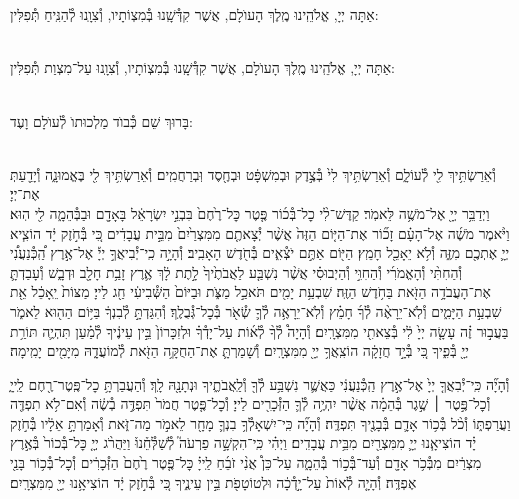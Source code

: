 \documentclass[twoside, openany, parskip=half, 11pt]{book}
\begin{document}
\\
\\
אַתָּה יְיָ, אֱלֹהֵֽינוּ מֶֽלֶךְ הָעוֺלָם, אֲשֶׁר קִדְּ֯שָֽׁנוּ בְּ֯מִצְוֹתָיו, וְ֯צִוָֽנוּ לְ֯הַנִּֽיחַ תְּ֯פִלִּין:

\\
אַתָּה יְיָ, אֱלֹהֵֽינוּ מֶֽלֶךְ הָעוֺלָם, אֲשֶׁר קִדְּ֯שָֽׁנוּ בְּ֯מִצְוֹתָיו, וְ֯צִוָֽנוּ עַל־מִצְוַת תְּ֯פִלִּין:

\\
בָּרוּךְ שֵׁם כְּ֯בוֺד מַלְכוּתוֺ לְ֯עוֺלָם וָעֶד:


\\
וְ֯אֵרַשְׂתִּ֥יךְ לִ֖י לְ֯עוֹלָ֑ם וְ֯אֵרַשְׂתִּ֥יךְ לִי֙ בְּ֯צֶ֣דֶק וּבְמִשְׁפָּ֔ט וּבְחֶ֖סֶד וּֽבְרַחֲמִֽים׃ וְ֯אֵרַשְׂתִּ֥יךְ לִ֖י בֶּאֱמוּנָ֑ה וְ֯יָדַ֖עַתְּ אֶת־יְיָ׃\\
וַיְדַבֵּ֥ר יְיָ֖ אֶל־מֹשֶׁ֥ה לֵּאמֹֽר׃ קַדֶּשׁ־לִ֨י כׇל־בְּ֯כ֜וֹר פֶּ֤טֶר כׇּל־רֶ֙חֶם֙ בִּבְנֵ֣י יִשְׂרָאֵ֔ל בָּאָדָ֖ם וּבַבְּ֯הֵמָ֑ה לִ֖י הֽוּא׃ וַיֹּ֨אמֶר מֹשֶׁ֜ה אֶל־הָעָ֗ם זָכ֞וֹר אֶת־הַיּ֤וֹם הַזֶּה֙ אֲשֶׁ֨ר יְ֯צָאתֶ֤ם מִמִּצְרַ֙יִם֙ מִבֵּ֣ית עֲבָדִ֔ים כִּ֚י בְּ֯חֹ֣זֶק יָ֔ד הוֹצִ֧יא יְיָ֛ אֶתְכֶ֖ם מִזֶּ֑ה וְ֯לֹ֥א יֵאָכֵ֖ל חָמֵֽץ׃ הַיּ֖וֹם אַתֶּ֣ם יֹצְ֯אִ֑ים בְּ֯חֹ֖דֶשׁ הָאָבִֽיב׃ וְ֯הָיָ֣ה כִֽי־יְ֯בִיאֲךָ֣ יְיָ֡ אֶל־אֶ֣רֶץ הַֽ֠כְּ֯נַעֲנִ֠י וְ֯הַחִתִּ֨י וְ֯הָאֱמֹרִ֜י וְ֯הַחִוִּ֣י וְ֯הַיְבוּסִ֗י אֲשֶׁ֨ר נִשְׁבַּ֤ע לַאֲבֹתֶ֙יךָ֙ לָ֣תֶת לָ֔ךְ אֶ֛רֶץ זָבַ֥ת חָלָ֖ב וּדְבָ֑שׁ וְ֯עָבַדְתָּ֛ אֶת־הָעֲבֹדָ֥ה הַזֹּ֖את בַּחֹ֥דֶשׁ הַזֶּֽה׃ שִׁבְעַ֥ת יָמִ֖ים תֹּאכַ֣ל מַצֹּ֑ת וּבַיּוֹם֙ הַשְּׁ֯בִיעִ֔י חַ֖ג לַייָ׃ מַצּוֹת֙ יֵֽאָכֵ֔ל אֵ֖ת שִׁבְעַ֣ת הַיָּמִ֑ים וְ֯לֹֽא־יֵרָאֶ֨ה לְ֯ךָ֜ חָמֵ֗ץ וְ֯לֹֽא־יֵרָאֶ֥ה לְ֯ךָ֛ שְׂ֯אֹ֖ר בְּ֯כׇל־גְּ֯בֻלֶֽךָ׃ וְ֯הִגַּדְתָּ֣ לְ֯בִנְךָ֔ בַּיּ֥וֹם הַה֖וּא לֵאמֹ֑ר בַּעֲב֣וּר זֶ֗ה עָשָׂ֤ה יְיָ֙ לִ֔י בְּ֯צֵאתִ֖י מִמִּצְרָֽיִם׃ וְ֯הָיָה֩ לְ֯ךָ֨ לְ֯א֜וֹת עַל־יָדְ֯ךָ֗ וּלְזִכָּרוֹן֙ בֵּ֣ין עֵינֶ֔יךָ לְ֯מַ֗עַן תִּהְיֶ֛ה תּוֹרַ֥ת יְיָ֖ בְּ֯פִ֑יךָ כִּ֚י בְּ֯יָ֣ד חֲזָקָ֔ה הוֹצִֽאֲךָ֥ יְיָ֖ מִמִּצְרָֽיִם׃ וְ֯שָׁמַרְתָּ֛ אֶת־הַחֻקָּ֥ה הַזֹּ֖את לְ֯מוֹעֲדָ֑הּ מִיָּמִ֖ים יָמִֽימָה׃

וְ֯הָיָ֞ה כִּֽי־יְ֯בִאֲךָ֤ יְיָ֙ אֶל־אֶ֣רֶץ הַֽכְּ֯נַעֲנִ֔י כַּאֲשֶׁ֛ר נִשְׁבַּ֥ע לְ֯ךָ֖ וְ֯לַֽאֲבֹתֶ֑יךָ וּנְתָנָ֖הּ לָֽךְ׃ וְ֯הַעֲבַרְתָּ֥ כׇל־פֶּֽטֶר־רֶ֖חֶם לַֽייָ֑ וְ֯כׇל־פֶּ֣טֶר ׀ שֶׁ֣גֶר בְּ֯הֵמָ֗ה אֲשֶׁ֨ר יִהְיֶ֥ה לְ֯ךָ֛ הַזְּ֯כָרִ֖ים לַייָ׃ וְ֯כׇל־פֶּ֤טֶר חֲמֹר֙ תִּפְדֶּ֣ה בְ֯שֶׂ֔ה וְ֯אִם־לֹ֥א תִפְדֶּ֖ה וַעֲרַפְתּ֑וֹ וְ֯כֹ֨ל בְּ֯כ֥וֹר אָדָ֛ם בְּ֯בָנֶ֖יךָ תִּפְדֶּֽה׃ וְ֯הָיָ֞ה כִּֽי־יִשְׁאָלְ֯ךָ֥ בִנְךָ֛ מָחָ֖ר לֵאמֹ֣ר מַה־זֹּ֑את וְ֯אָמַרְתָּ֣ אֵלָ֔יו בְּ֯חֹ֣זֶק יָ֗ד הוֹצִיאָ֧נוּ יְיָ֛ מִמִּצְרַ֖יִם מִבֵּ֥ית עֲבָדִֽים׃ וַיְהִ֗י כִּֽי־הִקְשָׁ֣ה פַרְעֹה֮ לְ֯שַׁלְּ֯חֵ֒נוּ֒ וַיַּהֲרֹ֨ג יְיָ֤ כׇּל־בְּ֯כוֹר֙ בְּ֯אֶ֣רֶץ מִצְרַ֔יִם מִבְּ֯כֹ֥ר אָדָ֖ם וְ֯עַד־בְּ֯כ֣וֹר בְּ֯הֵמָ֑ה עַל־כֵּן֩ אֲנִ֨י זֹבֵ֜חַ לַֽייָ֗ כׇּל־פֶּ֤טֶר רֶ֙חֶם֙ הַזְּ֯כָרִ֔ים וְ֯כׇל־בְּ֯כ֥וֹר בָּנַ֖י אֶפְדֶּֽה׃ וְ֯הָיָ֤ה לְ֯אוֹת֙ עַל־יָ֣דְ֯כָ֔ה וּלְטוֹטָפֹ֖ת בֵּ֣ין עֵינֶ֑יךָ כִּ֚י בְּ֯חֹ֣זֶק יָ֔ד הוֹצִיאָ֥נוּ יְיָ֖ מִמִּצְרָֽיִם׃
\end{document}
